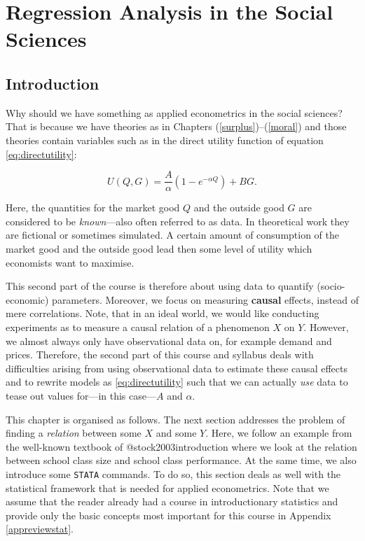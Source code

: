 \documentclass[
]{book}
\begin{document}
\hypertarget{univariateregression}{%
\chapter{Regression Analysis in the Social Sciences}\label{univariateregression}}

\hypertarget{introduction-12}{%
\section{Introduction}\label{introduction-12}}

Why should we have something as applied econometrics in the social sciences? That is because we have theories as in Chapters (\ref{surplus})--(\ref{moral}) and those theories contain variables such as in the direct utility function of equation \eqref{eq:directutility}:

\begin{equation}
U(Q,G) = \frac{A}{\alpha}\left( 1- e^{-\alpha Q} \right ) + BG.
\end{equation}

Here, the quantities for the market good \(Q\) and the outside good \(G\) are considered to be \emph{known}---also often referred to as data. In theoretical work they are fictional or sometimes simulated. A certain amount of consumption of the market good and the outside good lead then some level of utility which economists want to maximise.

This second part of the course is therefore about using data to quantify (socio-economic) parameters. Moreover, we focus on measuring \textbf{causal} effects, instead of mere correlations. Note, that in an ideal world, we would like conducting experiments as to measure a causal relation of a phenomenon \(X\) on \(Y\). However, we almost always only have observational data on, for example demand and prices. Therefore, the second part of this course and syllabus deals with difficulties arising from using observational data to estimate these causal effects and to rewrite models as \eqref{eq:directutility} such that we can actually \emph{use} data to tease out values for---in this case---\(A\) and \(\alpha\).

This chapter is organised as follows. The next section addresses the problem of finding a \emph{relation} between some \(X\) and some \(Y\). Here, we follow an example from the well-known textbook of @stock2003introduction where we look at the relation between school class size and school class performance. At the same time, we also introduce some \texttt{STATA} commands. To do so, this section deals as well with the statistical framework that is needed for applied econometrics. Note that we assume that the reader already had a course in introductionary statistics and provide only the basic concepts most important for this course in Appendix \ref{appreviewstat}.
\end{document}
